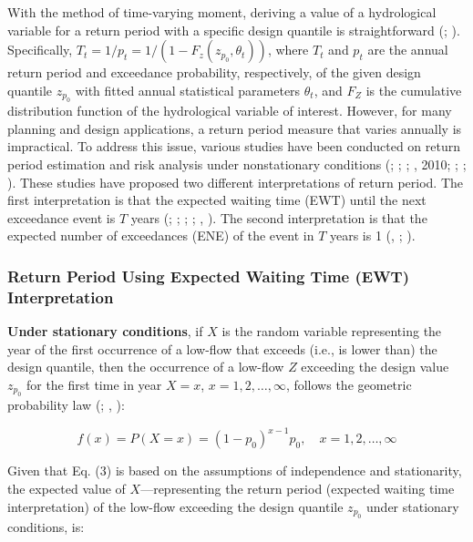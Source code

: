 \documentclass[
]{krantz}
\begin{document}
With the method of time-varying moment, deriving a value of a hydrological variable for a return period with a specific design quantile is straightforward (\citet{Olsen1998}; \citet{Villarini2009}). Specifically, \(T_{t}=1 / p_{t}=1 /\left(1-F_{z}\left(z_{p_{0}}, {\theta}_{t}\right)\right)\), where \(T_{t}\) and \(p_{t}\) are the annual return period and exceedance probability, respectively, of the given design quantile \(z_{p_{0}}\) with fitted annual statistical parameters \({\theta}_{t}\), and \(F_{Z}\) is the cumulative distribution function of the hydrological variable of interest. However, for many planning and design applications, a return period measure that varies annually is impractical. To address this issue, various studies have been conducted on return period estimation and risk analysis under nonstationary conditions (\citet{Wigley1988}; \citet{Wigley2009}; \citet{Olsen1998}; \citet{Parey2007}, 2010; \citet{Cooley2013}; \citet{Salas2013}; \citet{Salas2014}). These studies have proposed two different interpretations of return period. The first interpretation is that the expected waiting time (EWT) until the next exceedance event is \(T\) years (\citet{Wigley1988}; \citet{Wigley2009}; \citet{Olsen1998}; \citet{Cooley2013}; \citet{Salas2013}, \citet{Salas2014}). The second interpretation is that the expected number of exceedances (ENE) of the event in \(T\) years is 1 (\citet{Parey2007}, \citet{Parey2010}; \citet{Cooley2013}).

\subsubsection{Return Period Using Expected Waiting Time (EWT) Interpretation}\label{return-period-using-expected-waiting-time-ewt-interpretation}

\textbf{Under stationary conditions}, if \(X\) is the random variable representing the year of the first occurrence of a low-flow that exceeds (i.e., is lower than) the design quantile, then the occurrence of a low-flow \(Z\) exceeding the design value \(z_{p_{0}}\) for the first time in year \(X=x\), \(x=1,2, \ldots, \infty\), follows the geometric probability law (\citet{Mood1974}; \citet{Salas2013}, \citet{Salas2014}):

\[
f(x)=P(X=x)=\left(1-p_{0}\right)^{x-1} p_{0}, \quad x=1,2, \ldots, \infty  \tag{6}
\]

Given that Eq. (3) is based on the assumptions of independence and stationarity, the expected value of \(X\)---representing the return period (expected waiting time interpretation) of the low-flow exceeding the design quantile \(z_{p_{0}}\) under stationary conditions, is:
\end{document}

